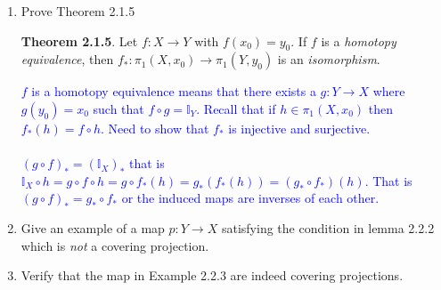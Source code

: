 \documentclass[12pt,a4paper]{report}
\newcommand{\RED}[1]{\textcolor{red}{#1}}
\newcommand{\BLUE}[1]{\textcolor{blue}{#1}}
\begin{document}
\begin{enumerate}[label=2.7.\arabic*]
\RED{The real issue was finding a mapping $H: (X, x_0)\times I \to (X, X_0)$ which is the deformation retract that maps $\varphi \to \tilde{\varphi}$ and is, hence, a constant mapping.  Where $H(t, 0) = \varphi(t)$ and $H(t, 1) = \tilde{\varphi}(t)$
\begin{align*}
	H(t,s) &= \BINDEF{\varphi(2t(1-s)) & 0 \le t \le \frac{1}{2}}{\varphi((2-2t)(1-s)) & \frac{1}{2}\le t \le 1}
\end{align*}With each value of $s$ is a loop from $x_0$ back to itself getting progressively smaller until $s=1$ then there is no loop.  This is called the \DEFINE{constant loop} or trivial mapping.\\
For example, when $s=1/4$ we have 
	\begin{align*}
			H(t,1/4) &= \BINDEF{\varphi(\frac{6t}{4}) & 0 \le t \le \frac{1}{2}}{\varphi(\frac{6}{4}-\frac{6t}{4}) & \frac{1}{2}\le t \le 1}
	\end{align*}We can see that the maximum value of $\frac{6t}{4}$ is $\frac{3}{4}$ for all of $t\in [0,1]$.  That is, as $t\to \frac{1}{2}$ the parameters for $\varphi$ reaches its maximum (regardless of the value of $s$) and returns back to $0$ as $t \to 1$.  And, when $s=1$ we get $H(t, 1) \equiv \varphi(0)$.
}

\item Prove Theorem 2.1.5

\textbf{Theorem 2.1.5}.  Let $f: X \to Y$ with $f(x_0)=y_0$.  If $f$ is a \textit{homotopy equivalence}, then $f_*:\pi_1(X,x_0)\to \pi_1(Y, y_0)$ is an \textit{isomorphism}.

\BLUE{$f$ is a homotopy equivalence means that there exists a $g:Y \to X$ where $g(y_0) = x_0$ such that $f\circ g = \mathbb{I}_Y$.  Recall that if $h \in \pi_1(X, x_0)$ then $f_*(h) = f\circ h$.  Need to show that $f_*$ is injective and surjective.\\
\\
$(g \circ f)_* = (\mathbb{I}_X)_*$ that is $\mathbb{I}_X \circ h = g\circ f\circ h = g\circ f_*(h) = g_*(f_*(h)) = (g_*\circ f_*)(h)$.  That is $(g \circ f)_* = g_*\circ f_*$ or the induced maps are inverses of each other.  
}

\item Give an example of a map $p:Y \to X$ satisfying the condition in lemma 2.2.2 which is \textit{not} a covering projection.

\item Verify that the map in Example 2.2.3 are indeed covering projections.


\end{enumerate}
\end{document}
